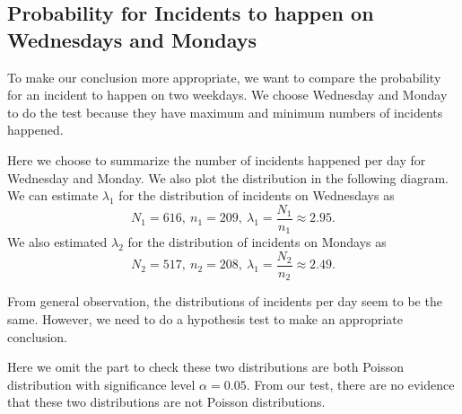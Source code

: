 \documentclass[11pt,a4paper,english]{article}
\begin{document}
\subsection{Probability for Incidents to happen on Wednesdays and Mondays}
To make our conclusion more appropriate, we want to compare the probability for an incident to happen on two weekdays. 
We choose Wednesday and Monday to do the test because they have maximum and minimum numbers of incidents happened.

Here we choose to summarize the number of incidents happened per day for Wednesday and Monday. We also plot the distribution in the following diagram.
We can estimate $\lambda_{1}$ for the distribution of incidents on Wednesdays as 
\begin{equation*}
N_{1} = 616,\ n_{1} = 209,\ \hat{\lambda_{1}} = \frac{N_{1}}{n_{1}} \approx 2.95.
\end{equation*}
We also estimated $\lambda_{2}$ for the distribution of incidents on Mondays as
\begin{equation*}
	N_{2} = 517,\ n_{2} = 208,\ \hat{\lambda_{1}} = \frac{N_{2}}{n_{2}} \approx 2.49.
\end{equation*}

From general observation, the distributions of incidents per day seem to be the same. However, we need to do a hypothesis test to make an appropriate conclusion.

Here we omit the part to check these two distributions are both Poisson distribution with significance level $\alpha = 0.05$. From our test, there are no evidence that these two distributions are not Poisson distributions.
\end{document}
